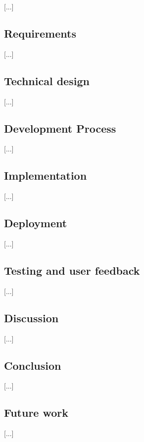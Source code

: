 [...]

\subsection{Requirements}

[...]

\subsection{Technical design}

[...]

\subsection{Development Process}

[...]

\subsection{Implementation}

[...]

\subsection{Deployment}

[...]

\subsection{Testing and user feedback}

[...]

\subsection{Discussion}

[...]

\subsection{Conclusion}

[...]

\subsection{Future work}

[...]
